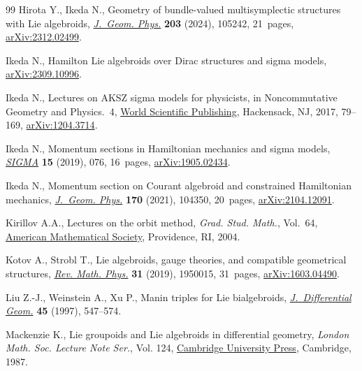 \begin{thebibliography}{99}
Hirota Y., Ikeda N., Geometry of bundle-valued multisymplectic structures with
 {L}ie algebroids, \href{https://doi.org/10.1016/j.geomphys.2024.105242}{\textit{J.~Geom. Phys.}} \textbf{203} (2024), 105242,
 21~pages, \href{https://arxiv.org/abs/2312.02499}{arXiv:2312.02499}.

Ikeda N., Hamilton {L}ie algebroids over {D}irac structures and sigma models,
 \href{https://arxiv.org/abs/2309.10996}{arXiv:2309.10996}.

Ikeda N., Lectures on {AKSZ} sigma models for physicists, in Noncommutative
 {G}eometry and {P}hysics.~4, \href{https://doi.org/10.1142/9789813144613_0003}{World Scientific Publishing}, Hackensack, NJ,
 2017, 79--169, \href{https://arxiv.org/abs/1204.3714}{arXiv:1204.3714}.

Ikeda N., Momentum sections in {H}amiltonian mechanics and sigma models,
 \href{https://doi.org/10.3842/SIGMA.2019.076}{\textit{SIGMA}} \textbf{15} (2019), 076, 16~pages, \href{https://arxiv.org/abs/1905.02434}{arXiv:1905.02434}.

Ikeda N., Momentum section on {C}ourant algebroid and constrained {H}amiltonian
 mechanics, \href{https://doi.org/10.1016/j.geomphys.2021.104350}{\textit{J.~Geom. Phys.}} \textbf{170} (2021), 104350, 20~pages,
 \href{https://arxiv.org/abs/2104.12091}{arXiv:2104.12091}.

Kirillov A.A., Lectures on the orbit method, \textit{Grad. Stud. Math.},
 Vol.~64, \href{https://doi.org/10.1090/gsm/064}{American Mathematical Society}, Providence, RI, 2004.

Kotov A., Strobl T., Lie algebroids, gauge theories, and compatible geometrical
 structures, \href{https://doi.org/10.1142/S0129055X19500156}{\textit{Rev. Math. Phys.}} \textbf{31} (2019), 1950015, 31~pages,
 \href{https://arxiv.org/abs/1603.04490}{arXiv:1603.04490}.

Liu Z.-J., Weinstein A., Xu P., Manin triples for {L}ie bialgebroids,
 \href{https://doi.org/10.4310/jdg/1214459842}{\textit{J.~Differential Geom.}} \textbf{45} (1997), 547--574.

Mackenzie K., Lie groupoids and {L}ie algebroids in differential geometry,
 \textit{London Math. Soc. Lecture Note Ser.}, Vol. 124, \href{https://doi.org/10.1017/CBO9780511661839}{Cambridge University
 Press}, Cambridge, 1987.


\end{thebibliography}
